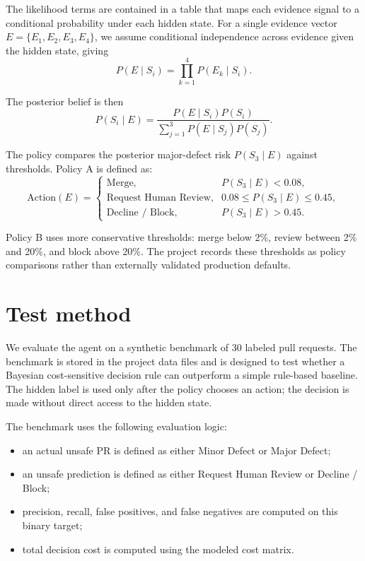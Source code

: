 \documentclass{article}
\begin{document}
The likelihood terms are contained in a table that maps each evidence signal to a conditional probability under each hidden state. For a single evidence vector $E = \{E_1, E_2, E_3, E_4\}$, we assume conditional independence across evidence given the hidden state, giving
\begin{equation}
P(E \mid S_i) = \prod_{k=1}^{4} P(E_k \mid S_i).
\end{equation}

The posterior belief is then
\begin{equation}
P(S_i \mid E) = \frac{P(E \mid S_i) P(S_i)}{\sum_{j=1}^{3} P(E \mid S_j) P(S_j)}.
\end{equation}

The policy compares the posterior major-defect risk $P(S_3 \mid E)$ against thresholds. Policy A is defined as:
\begin{equation}
\text{Action}(E)=
\begin{cases}
\text{Merge}, & P(S_3 \mid E) < 0.08, \\
\text{Request Human Review}, & 0.08 \leq P(S_3 \mid E) \leq 0.45, \\
\text{Decline / Block}, & P(S_3 \mid E) > 0.45.
\end{cases}
\end{equation}

Policy B uses more conservative thresholds: merge below 2\%, review between 2\% and 20\%, and block above 20\%. The project records these thresholds as policy comparisons rather than externally validated production defaults.

\section{Test method}

We evaluate the agent on a synthetic benchmark of 30 labeled pull requests. The benchmark is stored in the project data files and is designed to test whether a Bayesian cost-sensitive decision rule can outperform a simple rule-based baseline. The hidden label is used only after the policy chooses an action; the decision is made without direct access to the hidden state.

The benchmark uses the following evaluation logic:
\begin{itemize}[leftmargin=1.2em, itemsep=0.2em]
    \item an actual unsafe PR is defined as either Minor Defect or Major Defect;
    \item an unsafe prediction is defined as either Request Human Review or Decline / Block;
    \item precision, recall, false positives, and false negatives are computed on this binary target;
    \item total decision cost is computed using the modeled cost matrix.
\end{itemize}
\end{document}
